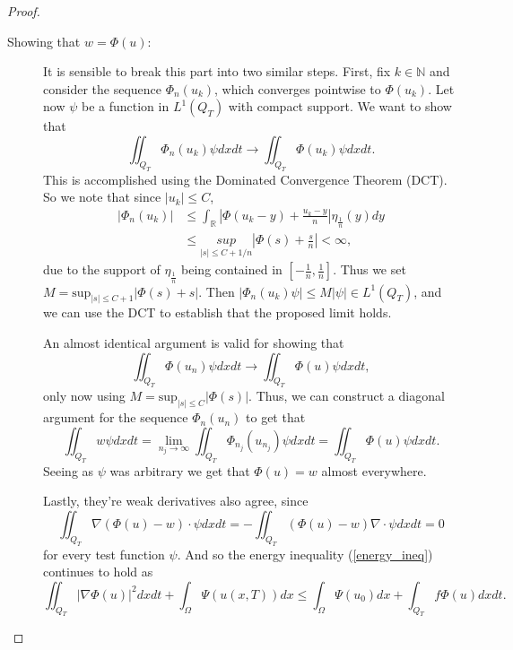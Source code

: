 \documentclass[11pt, a4paper]{article}
\begin{document}
\begin{proof}
\begin{description}
	\item[Showing that $w=\Phi(u)$:] It is sensible to break this part into two similar steps. First, fix $k \in \mathbb{N}$ and consider the sequence $\Phi_n(u_k)$, which converges pointwise to $\Phi(u_k)$. Let now $\psi$ be a function in $L^1(Q_T)$ with compact support. We want to show that
	\begin{equation*}
	\iint_{Q_T} \Phi_n(u_k) \psi dxdt \to \iint_{Q_T}\Phi(u_k)\psi dxdt.
	\end{equation*}
	This is accomplished using the Dominated Convergence Theorem (DCT). So we note that since $|u_k| \leq C$, 
	\begin{align*}
    |\Phi_n(u_k)| &\leq \int_\mathbb{R} \left| \Phi(u_k-y) + \frac{u_k-y}{n}\right|\eta_{\frac{1}{n}}(y)dy \\
    &\leq \underset{|s|\leq C+1/n}{sup}\left| \Phi(s) + \frac{s}{n}\right| < \infty,
	\end{align*}
	due to the support of $\eta_{\frac{1}{n}}$ being contained in $\left[ -\frac{1}{n}, \frac{1}{n}\right]$. Thus we set $M = \mathrm{sup}_{|s|\leq C+1}\left|\Phi(s) + s\right|$. Then $|\Phi_n(u_k)\psi| \leq M|\psi| \in L^1(Q_T)$, and we can use the DCT to establish that the proposed limit holds.
	
	An almost identical argument is valid for showing that
	\begin{equation*}
	\iint_{Q_T}\Phi(u_n)\psi dxdt \to \iint_{Q_T}\Phi(u)\psi dxdt,
	\end{equation*}		
	only now using $M = \mathrm{sup}_{|s|\leq C}|\Phi(s)|$. Thus, we can construct a diagonal argument for the sequence $\Phi_n(u_n)$ to get that
	\begin{equation}
	\iint_{Q_T} w\psi dxdt = \lim_{n_j \to \infty} \iint_{Q_T}\Phi_{n_j}(u_{n_j})\psi dxdt = \iint_{Q_T} \Phi(u) \psi dxdt.
	\end{equation}
	Seeing as $\psi$ was arbitrary we get that $\Phi(u) = w$ almost everywhere.
	
	Lastly, they're weak derivatives also agree, since
	\begin{equation*}
	\iint_{Q_T}\nabla(\Phi(u) - w) \cdot \psi dxdt = -\iint_{Q_T}(\Phi(u)-w)\nabla \cdot \psi dxdt = 0 
	\end{equation*}
	for every test function $\psi$.
	 And so the energy inequality (\ref{energy_ineq}) continues to hold as
	\begin{equation}
	\iint_{Q_T}|\nabla \Phi(u)|^2dxdt + \int_\Omega \Psi(u(x,T))dx \leq \int_\Omega \Psi(u_0)dx + \int_{Q_T} f\Phi(u)dxdt.
	\end{equation}
	 

\end{description}
\end{proof}
\end{document}
